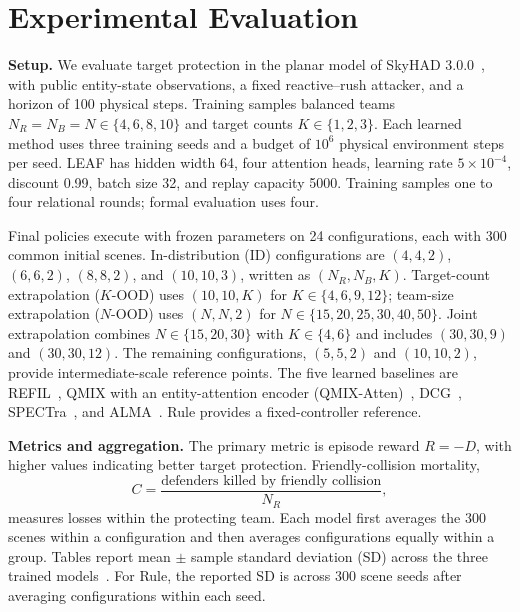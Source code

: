 \section{Experimental Evaluation}
\label{sec:results}


\noindent\textbf{Setup.}
We evaluate target protection in the planar model of SkyHAD 3.0.0~\cite{skyhad2026}, with public entity-state observations, a fixed reactive--rush attacker, and a horizon of 100 physical steps. Training samples balanced teams $N_R=N_B=N\in\{4,6,8,10\}$ and target counts $K\in\{1,2,3\}$. Each learned method uses three training seeds and a budget of $10^6$ physical environment steps per seed. LEAF has hidden width 64, four attention heads, learning rate $5\times10^{-4}$, discount 0.99, batch size 32, and replay capacity 5000. Training samples one to four relational rounds; formal evaluation uses four.

Final policies execute with frozen parameters on 24 configurations, each with 300 common initial scenes. In-distribution (ID) configurations are $(4,4,2)$, $(6,6,2)$, $(8,8,2)$, and $(10,10,3)$, written as $(N_R,N_B,K)$. Target-count extrapolation ($K$-OOD) uses $(10,10,K)$ for $K\in\{4,6,9,12\}$; team-size extrapolation ($N$-OOD) uses $(N,N,2)$ for $N\in\{15,20,25,30,40,50\}$. Joint extrapolation combines $N\in\{15,20,30\}$ with $K\in\{4,6\}$ and includes $(30,30,9)$ and $(30,30,12)$. The remaining configurations, $(5,5,2)$ and $(10,10,2)$, provide intermediate-scale reference points. The five learned baselines are REFIL~\cite{iqbal2021refil}, QMIX with an entity-attention encoder (QMIX-Atten)~\cite{rashid2018qmix}, DCG~\cite{boehmer2020dcg}, SPECTra~\cite{park2026spectra}, and ALMA~\cite{iqbal2022alma}. Rule provides a fixed-controller reference.

\noindent\textbf{Metrics and aggregation.}
The primary metric is episode reward $R=-D$, with higher values indicating better target protection. Friendly-collision mortality,
\begin{equation}
 C=\frac{\text{defenders killed by friendly collision}}{N_R},
\end{equation}
measures losses within the protecting team. Each model first averages the 300 scenes within a configuration and then averages configurations equally within a group. Tables report mean $\pm$ sample standard deviation (SD) across the three trained models~\cite{agarwal2021rliable}. For Rule, the reported SD is across 300 scene seeds after averaging configurations within each seed.

